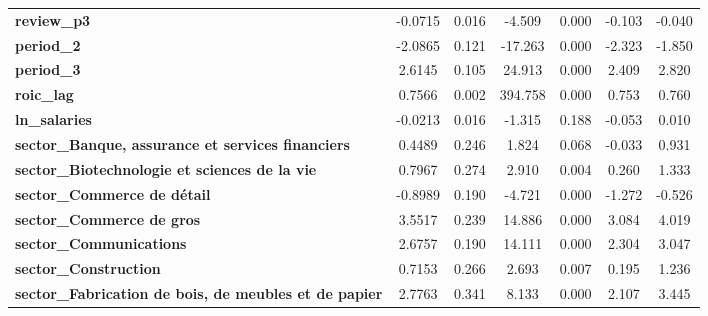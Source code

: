 \begin{center}
\begin{tabular}{lcccccc}
\textbf{review\_p3}                                                   &      -0.0715  &        0.016     &    -4.509  &         0.000        &       -0.103    &       -0.040     \\
\textbf{period\_2}                                                    &      -2.0865  &        0.121     &   -17.263  &         0.000        &       -2.323    &       -1.850     \\
\textbf{period\_3}                                                    &       2.6145  &        0.105     &    24.913  &         0.000        &        2.409    &        2.820     \\
\textbf{roic\_lag}                                                    &       0.7566  &        0.002     &   394.758  &         0.000        &        0.753    &        0.760     \\
\textbf{ln\_salaries}                                                 &      -0.0213  &        0.016     &    -1.315  &         0.188        &       -0.053    &        0.010     \\
\textbf{sector\_Banque, assurance et services financiers}             &       0.4489  &        0.246     &     1.824  &         0.068        &       -0.033    &        0.931     \\
\textbf{sector\_Biotechnologie et sciences de la vie}                 &       0.7967  &        0.274     &     2.910  &         0.004        &        0.260    &        1.333     \\
\textbf{sector\_Commerce de détail}                                   &      -0.8989  &        0.190     &    -4.721  &         0.000        &       -1.272    &       -0.526     \\
\textbf{sector\_Commerce de gros}                                     &       3.5517  &        0.239     &    14.886  &         0.000        &        3.084    &        4.019     \\
\textbf{sector\_Communications}                                       &       2.6757  &        0.190     &    14.111  &         0.000        &        2.304    &        3.047     \\
\textbf{sector\_Construction}                                         &       0.7153  &        0.266     &     2.693  &         0.007        &        0.195    &        1.236     \\
\textbf{sector\_Fabrication de bois, de meubles et de papier}         &       2.7763  &        0.341     &     8.133  &         0.000        &        2.107    &        3.445     \\

\end{tabular}
\end{center}
